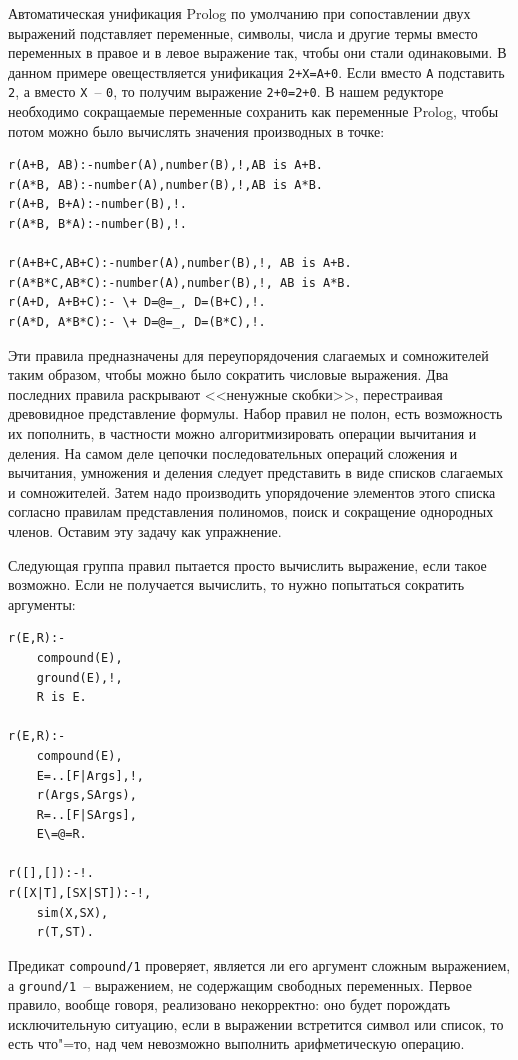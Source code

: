 \documentclass[a4paper,14pt, openany, twoside, final]{extbook} %
\begin{document}
Автоматическая унификация Prolog по умолчанию при сопоставлении двух выражений подставляет переменные, символы, числа и другие термы вместо переменных в правое и в левое выражение так, чтобы они стали одинаковыми.  В данном примере овеществляется унификация \texttt{2+X=A+0}.  Если вместо \texttt{A} подставить \texttt{2}, а вместо \texttt{X}~-- \texttt{0}, то получим выражение \texttt{2+0=2+0}.  В нашем редукторе необходимо сокращаемые переменные сохранить как переменные \foreignlanguage{english}{Prolog}, чтобы потом можно было вычислять значения производных в точке:

\begin{verbatim}
r(A+B, AB):-number(A),number(B),!,AB is A+B.
r(A*B, AB):-number(A),number(B),!,AB is A*B.
r(A+B, B+A):-number(B),!.
r(A*B, B*A):-number(B),!.

r(A+B+C,AB+C):-number(A),number(B),!, AB is A+B.
r(A*B*C,AB*C):-number(A),number(B),!, AB is A*B.
r(A+D, A+B+C):- \+ D=@=_, D=(B+C),!.
r(A*D, A*B*C):- \+ D=@=_, D=(B*C),!.
\end{verbatim}

Эти правила предназначены для переупорядочения слагаемых и сомножителей таким образом, чтобы можно было сократить числовые выражения.  Два последних правила раскрывают <<ненужные скобки>>, перестраивая древовидное представление формулы.  Набор правил не полон, есть возможность их пополнить, в частности можно алгоритмизировать операции вычитания и деления.  На самом деле цепочки последовательных операций сложения и вычитания, умножения и деления следует представить в виде списков слагаемых и сомножителей.  Затем надо производить упорядочение элементов этого списка согласно правилам представления полиномов, поиск и сокращение однородных членов.  Оставим эту задачу как упражнение.

Следующая группа правил пытается просто вычислить выражение, если такое возможно.  Если не получается вычислить, то нужно попытаться сократить аргументы:\enlargethispage{-2em}

\begin{verbatim}
r(E,R):-
    compound(E),
    ground(E),!,
    R is E.

r(E,R):-
    compound(E),
    E=..[F|Args],!,
    r(Args,SArgs),
    R=..[F|SArgs],
    E\=@=R.

r([],[]):-!.
r([X|T],[SX|ST]):-!,
    sim(X,SX),
    r(T,ST).
\end{verbatim}

Предикат \texttt{compound/1} проверяет, является ли его аргумент сложным выражением, а \texttt{ground/1}~-- выражением, не содержащим свободных переменных.  Первое правило, вообще говоря, реализовано некорректно: оно будет порождать исключительную ситуацию, если в выражении встретится символ или список, то есть что"=то, над чем невозможно выполнить арифметическую операцию.
\end{document}
